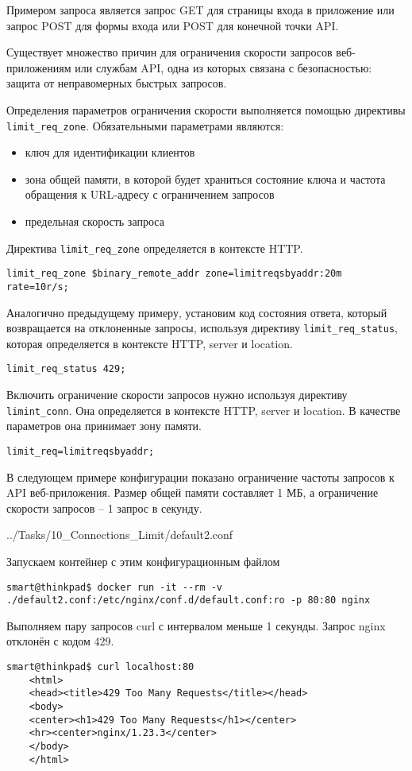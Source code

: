Примером запроса является запрос GET для страницы входа в приложение или запрос POST для формы входа или POST для конечной точки API.

Существует множество причин для ограничения скорости запросов веб-приложениям или службам API, одна из которых связана с безопасностью: защита от неправомерных быстрых запросов.

Определения параметров ограничения скорости выполняется помощью директивы \texttt{limit\_req\_zone}. Обязательными параметрами являются:
\begin{itemize}
    \item ключ для идентификации клиентов
    \item зона общей памяти, в которой будет храниться состояние ключа и частота обращения к URL-адресу с ограничением запросов
    \item предельная скорость запроса
\end{itemize}

Директива \texttt{limit\_req\_zone} определяется в контексте HTTP.

\texttt{limit\_req\_zone \$binary\_remote\_addr zone=limitreqsbyaddr:20m rate=10r/s;}

Аналогично предыдущему примеру, установим код состояния ответа, который возвращается на отклоненные запросы, используя директиву \texttt{limit\_req\_status}, которая определяется в контексте HTTP, server и location.

\texttt{limit\_req\_status 429;}

Включить ограничение скорости запросов нужно используя директиву \texttt{limint\_conn}. Она определяется в контексте HTTP, server и location. В качестве параметров она принимает зону памяти.

\texttt{limit\_req=limitreqsbyaddr;}

В следующем примере конфигурации показано ограничение частоты запросов к API веб-приложения. Размер общей памяти составляет 1 МБ, а ограничение скорости запросов -- 1 запрос в секунду.

{../Tasks/10_Connections_Limit/default2.conf}

Запускаем контейнер с этим конфигурационным файлом
\begin{lstlisting}[style=CommandLineStyle]
    smart@thinkpad$ docker run -it --rm -v ./default2.conf:/etc/nginx/conf.d/default.conf:ro -p 80:80 nginx
\end{lstlisting}

Выполняем пару запросов curl с интервалом меньше 1 секунды. Запрос nginx отклонён с кодом 429.
\begin{lstlisting}[style=CommandLineStyle]
    smart@thinkpad$ curl localhost:80
    <html>
    <head><title>429 Too Many Requests</title></head>
    <body>
    <center><h1>429 Too Many Requests</h1></center>
    <hr><center>nginx/1.23.3</center>
    </body>
    </html>
\end{lstlisting}

